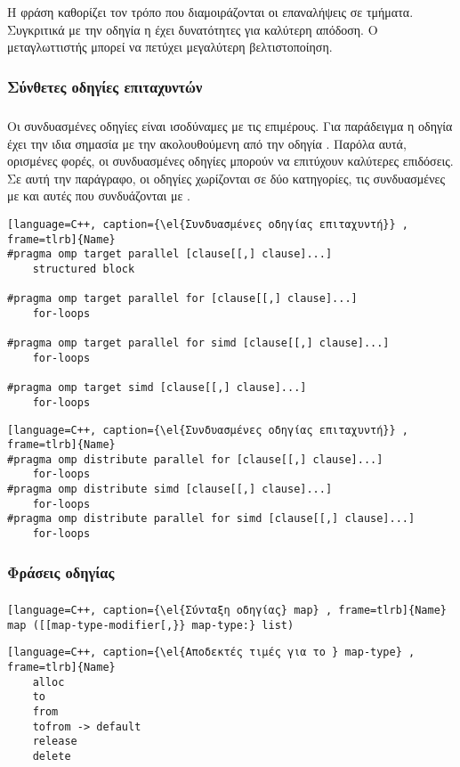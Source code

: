 Η φράση \emph{} καθορίζει τον τρόπο που διαμοιράζονται οι επαναλήψεις σε τμήματα. Συγκριτικά με την οδηγία \emph{} η \emph{} έχει δυνατότητες για καλύτερη απόδοση. Ο μεταγλωττιστής μπορεί να πετύχει μεγαλύτερη βελτιστοποίηση.



\subsubsection{Σύνθετες οδηγίες επιταχυντών}
\subparagraph{}

Οι συνδυασμένες οδηγίες είναι ισοδύναμες με τις επιμέρους. Για παράδειγμα η οδηγία \emph{} έχει την ιδια σημασία με την \emph{} ακολουθούμενη από την οδηγία \emph{}. Παρόλα αυτά, ορισμένες φορές, οι συνδυασμένες οδηγίες μπορούν να επιτύχουν καλύτερες επιδόσεις.
Σε αυτή την παράγραφο, οι οδηγίες χωρίζονται σε δύο κατηγορίες, τις συνδυασμένες με \emph{} και αυτές που συνδυάζονται με \emph{}.

\begin{lstlisting}[language=C++, caption={\el{Συνδυασμένες οδηγίας επιταχυντή}} , frame=tlrb]{Name}
#pragma omp target parallel [clause[[,] clause]...]
	structured block

#pragma omp target parallel for [clause[[,] clause]...]
	for-loops
	
#pragma omp target parallel for simd [clause[[,] clause]...]
	for-loops
	
#pragma omp target simd [clause[[,] clause]...]
	for-loops
\end{lstlisting}


\begin{lstlisting}[language=C++, caption={\el{Συνδυασμένες οδηγίας επιταχυντή}} , frame=tlrb]{Name}
#pragma omp distribute parallel for [clause[[,] clause]...]
	for-loops
#pragma omp distribute simd [clause[[,] clause]...]
	for-loops
#pragma omp distribute parallel for simd [clause[[,] clause]...]
	for-loops
\end{lstlisting}


\subsubsection{Φράσεις οδηγίας \emph{}}
\subparagraph{}
\begin{lstlisting}[language=C++, caption={\el{Σύνταξη οδηγίας} map} , frame=tlrb]{Name}
map ([[map-type-modifier[,}} map-type:} list)

\end{lstlisting}
\begin{lstlisting}[language=C++, caption={\el{Αποδεκτές τιμές για το } map-type} , frame=tlrb]{Name}
	alloc
	to
	from
	tofrom -> default
	release
	delete
\end{lstlisting}

